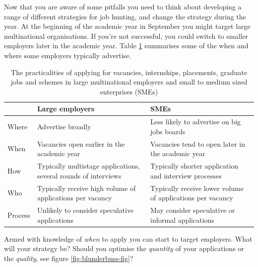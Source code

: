 \documentclass[
]{book}
\begin{document}
Now that you are aware of some pitfalls you need to think about developing a range of different strategies for job hunting, and change the strategy during the year. At the beginning of the academic year in September you might target large multinational organisations. If you're not successful, you could switch to smaller employers later in the academic year. Table \ref{tab:shortcuts} summarises some of the when and where some employers typically advertise.

\begin{table}

\caption{\label{tab:shortcuts}The practicalities of applying for vacancies, internships, placements, graduate jobs and schemes in large multinational employers and small to medium sized enterprises (SMEs)}
\centering
\begin{tabular}[t]{lll}
\toprule
 & Large employers & SMEs\\
\midrule
Where & Advertise broadly & Less likely to advertise on big jobs boards\\
When & Vacancies open earlier in the academic year & Vacancies tend to open later in the academic year\\
How & Typically multistage applications, several rounds of interviews & Typically shorter application and interview processes\\
Who & Typically receive high volume of applications per vacancy & Typically receive lower volume of applications per vacancy\\
Process & Unlikely to consider speculative applications & May consider speculative or informal applications\\
\bottomrule
\end{tabular}
\end{table}

Armed with knowledge of \emph{when} to apply you can start to target employers. What will your strategy be? Should you optimise the \emph{quantity} of your applications or the \emph{quality}, see figure \ref{fig:blunderbuss-fig}?
\end{document}
